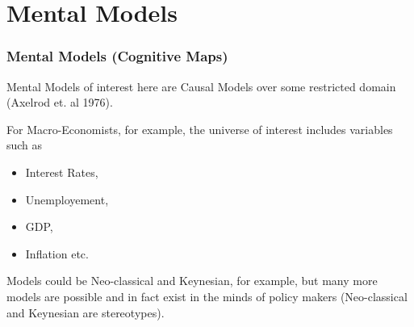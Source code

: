 \documentclass{beamer}
\begin{document}
\section{Mental Models}
\begin{frame}
\frametitle{Mental Models (Cognitive Maps)}
Mental Models of interest here are Causal Models over some restricted domain (Axelrod et. al 1976).

For Macro-Economists, for example, the universe of interest includes variables such as
\begin{itemize}
\item Interest Rates,
\item Unemployement,
\item GDP,
\item Inflation etc.
\end{itemize}
Models could be Neo-classical and Keynesian, for example, but many more models are possible and in fact exist in the minds of policy makers (Neo-classical and Keynesian are stereotypes).
\end{frame}
\end{document}
